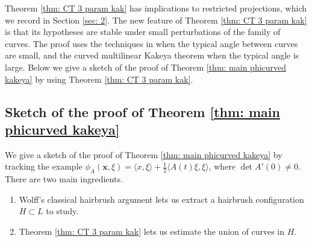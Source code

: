 \documentclass[12pt]{amsart}
\newcommand{\x}{{\bf{x}}}
\numberwithin{equation}{section}
\newcommand{\1}{\mathbbm{1}}
\renewcommand{\x}{\mathbf x}
\begin{document}
Theorem \ref{thm: CT 3 param kak} has implications to restricted projections, which we record in Section \ref{sec: 2}. The new feature of Theorem \ref{thm: CT 3 param kak} is that its hypotheses are stable under small perturbations of the family of curves. 
The proof uses the techniques in \cite{KWZ} when the typical angle between curves are small, and the curved multilinear Kakeya theorem \cite[Theorem 6]{BourgainGuth} when the typical angle is large. Below we give a sketch of the proof of Theorem \ref{thm: main phicurved kakeya} by using Theorem \ref{thm: CT 3 param kak}.


\subsection{Sketch of the proof of Theorem \ref{thm: main phicurved kakeya}}\label{subsec: sketch of pf}

We give a sketch of the proof of Theorem \ref{thm: main phicurved kakeya} by tracking the example $\phi_A(\x,\xi) = \langle x,\xi \rangle + \tfrac{1}{2}\langle A(t)\xi, \xi \rangle$, where $\det A'(0) \neq 0$.
There are two main ingredients. 
\begin{enumerate}
    \item Wolff's classical hairbrush argument lets us extract a hairbrush configuration $H \subset L$ to study. 
    \item Theorem \ref{thm: CT 3 param kak} lets us estimate the union of curves in $H$.
\end{enumerate}
\end{document}
